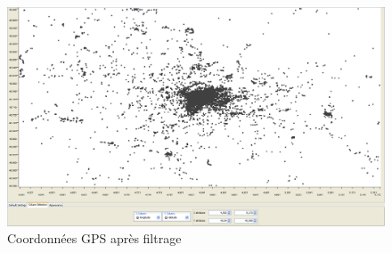         \begin{figure}[h]
            \centering
            \includegraphics[scale=0.22]{../screenshots/geographic_after.png}
            \caption{Coordonn\'ees GPS apr\`es filtrage}
            \label{diagram:geographic_after}
        \end{figure}
